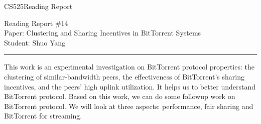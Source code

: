 \documentclass[11pt]{article}
\def\CourseCode{CS525}
\def\ReportNo{14}
\def\Category{Reading Report}
\def\PaperTitle{Clustering and Sharing Incentives in BitTorrent
  Systems}
\def\Author{Shuo Yang}
\begin{document}
\noindent

\CourseCode \hfill \Category

\begin{center}
Reading Report \#\ReportNo\\
Paper: \PaperTitle\\
Student: \Author\\
\end{center}

\hrule\smallskip
\vspace{1.5em}
This work is an experimental investigation on BitTorrent protocol
properties: the clustering of similar-bandwidth peers, the
effectiveness of BitTorrent's sharing incentives, and the peers' high
uplink utilization. It helps us to better understand BitTorrent
protocol. Based on this work, we can do some followup work on
BitTorrent protocol. We will look at three aspects: performance,
fair sharing and BitTorrent for streaming.
\end{document}
